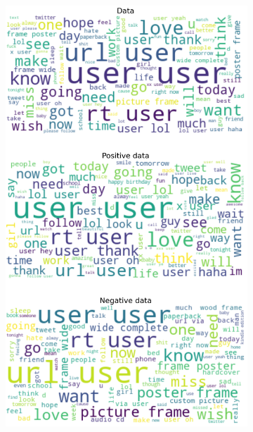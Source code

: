 \documentclass{article}
\begin{document}
\begin{itemize}
\begin{figure}[H]
\centering
\captionsetup{justification=centering}
\begin{subfigure}[b]{0.24\textwidth}
\centering
\includegraphics[width=\textwidth]{chapter-06/section-01-01/06/visualization/1/wordcloud.png}
\end{subfigure}
\begin{subfigure}[b]{0.24\textwidth}
\centering

\end{subfigure}
\end{figure}
\end{itemize}
\end{document}

